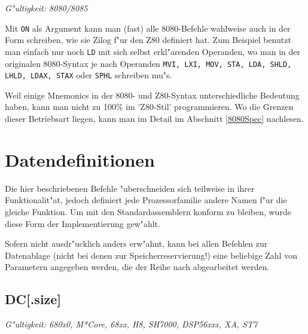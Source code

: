 \documentclass[12pt,a4paper,twoside]{report}
\makeatletter
\newcommand{\tty}[1]{{\tt #1}}
\newcommand{\ttindex}[1]{\index{#1@{\tt #1}}}
\makeatother
\begin{document}
{{\em G"ultigkeit: 8080/8085}

Mit \tty{ON} als Argument kann man (fast) alle 8080-Befehle wahlweise
auch in der Form schreiben, wie sie Zilog f"ur den Z80 definiert hat. 
Zum Beispiel benutzt man einfach nur noch \tty{LD} mit sich selbst
erkl"arenden Operanden, wo man in der originalen 8080-Syntax je nach
Operanden \tty{MVI, LXI, MOV, STA, LDA, SHLD, LHLD, LDAX, STAX} oder
\tty{SPHL} schreiben mu"s.

Weil einige Mnemonics in der 8080- und Z80-Syntax unterschiedliche
Bedeutung haben, kann man nicht zu 100\% im 'Z80-Stil' programmieren. 
Wo die Grenzen dieser Betriebsart liegen, kann man im Detail im
Abschnitt \ref{8080Spec} nachlesen.


\section{Datendefinitionen}

Die hier beschriebenen Befehle "uberschneiden sich teilweise in ihrer
Funktionalit"at, jedoch definiert jede Prozessorfamilie andere Namen
f"ur die gleiche Funktion.  Um mit den Standardassemblern konform zu
bleiben, wurde diese Form der Implementierung gew"ahlt.

Sofern nicht ausdr"ucklich anders erw"ahnt, kann bei allen Befehlen zur
Datenablage (nicht bei denen zur Speicherreservierung!) eine beliebige Zahl
von Parametern angegeben werden, die der Reihe nach abgearbeitet werden.


\subsection{DC[.size]}
\ttindex{DC}

{\em G"ultigkeit: 680x0, M*Core, 68xx, H8, SH7000, DSP56xxx, XA, ST7}

}
\end{document}
